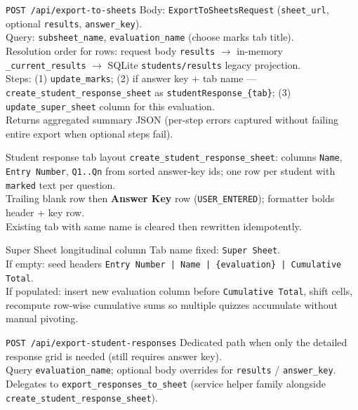 \documentclass[aspectratio=169]{beamer}
\begin{document}
\begin{frame}[fragile]{\texttt{POST /api/export-to-sheets}}
  \small
  Body: \texttt{ExportToSheetsRequest} (\texttt{sheet\_url}, optional \texttt{results}, \texttt{answer\_key}).\\
  Query: \texttt{subsheet\_name}, \texttt{evaluation\_name} (choose marks tab title).\\
  Resolution order for rows: request body \texttt{results} $\rightarrow$ in-memory \texttt{\_current\_results} $\rightarrow$ SQLite \texttt{students/results} legacy projection.\\
  Steps: (1) \texttt{update\_marks}; (2) if answer key + tab name --- \texttt{create\_student\_response\_sheet} as \texttt{studentResponse\_\{tab\}}; (3) \texttt{update\_super\_sheet} column for this evaluation.\\
  Returns aggregated summary JSON (per-step errors captured without failing entire export when optional steps fail).
\end{frame}

\begin{frame}{Student response tab layout}
  \small
  \texttt{create\_student\_response\_sheet}: columns \texttt{Name}, \texttt{Entry Number}, \texttt{Q1..Qn} from sorted answer-key ids; one row per student with \texttt{marked} text per question.\\
  Trailing blank row then \textbf{Answer Key} row (\texttt{USER\_ENTERED}); formatter bolds header + key row.\\
  Existing tab with same name is cleared then rewritten idempotently.
\end{frame}

\begin{frame}{Super Sheet longitudinal column}
  \small
  Tab name fixed: \texttt{Super Sheet}.\\
  If empty: seed headers \texttt{Entry Number | Name | \{evaluation\} | Cumulative Total}.\\
  If populated: insert new evaluation column before \texttt{Cumulative Total}, shift cells, recompute row-wise cumulative sums so multiple quizzes accumulate without manual pivoting.
\end{frame}

\begin{frame}[fragile]{\texttt{POST /api/export-student-responses}}
  \small
  Dedicated path when only the detailed response grid is needed (still requires answer key).\\
  Query \texttt{evaluation\_name}; optional body overrides for \texttt{results} / \texttt{answer\_key}.\\
  Delegates to \texttt{export\_responses\_to\_sheet} (service helper family alongside \texttt{create\_student\_response\_sheet}).
\end{frame}
\end{document}
